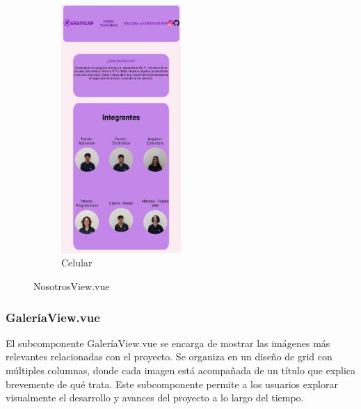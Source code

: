 \begin{figure} [H]
\begin{subfigure}{0.4\textwidth}
                        \includegraphics[width=0.5\textwidth]{Imagenes/Página Web/Celular/Integrantes.jpg}
                        \caption{Celular}
                        \label{fig:pw3.2}
                    \end{subfigure}
                    \hfill
                            
                    \caption{NosotrosView.vue}
                    \label{fig:pw3}
                    \end{figure}
                    
                \subsubsection{GaleríaView.vue}
                    El subcomponente GaleríaView.vue se encarga de mostrar las imágenes más relevantes relacionadas con el proyecto. Se organiza en un diseño de grid con múltiples columnas, donde cada imagen está acompañada de un título que explica brevemente de qué trata. Este subcomponente permite a los usuarios explorar visualmente el desarrollo y avances del proyecto a lo largo del tiempo.\par

